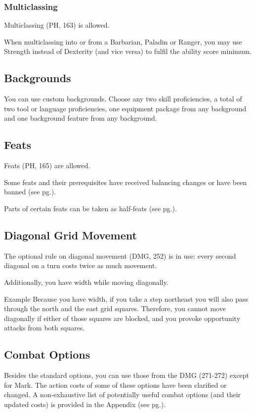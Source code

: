 \documentclass[letterpaper,twocolumn,openany,nodeprecatedcode]{dndbook}
\newcommand{\pg}[1]{pg.\pageref{#1}}
\begin{document}
\subsubsection{Multiclassing}
Multiclassing (PH, 163) is allowed. 

When multiclassing into or from a Barbarian, Paladin or Ranger, you may use Strength instead of Dexterity (and vice versa) to fulfil the ability score minimum. 

\subsection{Backgrounds}
You can use custom backgrounds. Choose any two skill proficiencies, a total of two tool or language proficiencies, one equipment package from any background and one background feature from any background.

\subsection{Feats}
Feats (PH, 165) are allowed. 

Some feats and their prerequisites have received balancing changes or have been banned (see \pg{balance-feats}).

Parts of certain feats can be taken as half-feats (see \pg{balance-feats-subfeats}).

\subsection{Diagonal Grid Movement}
The optional rule on diagonal movement (DMG, 252) is in use: every second diagonal on a turn costs twice as much movement.

Additionally, you have width while moving diagonally. 

\begin{DndComment}{Example}
Because you have width, if you take a step northeast you will also pass through the north and the east grid squares. Therefore, you cannot move diagonally if either of those squares are blocked, and you provoke opportunity attacks from both squares.
\end{DndComment}
\subsection{Combat Options}
Besides the standard options, you can use those from the DMG (271-272) except for Mark. The action costs of some of these options have been clarified or changed. A non-exhaustive list of potentially useful combat options (and their updated costs) is provided in the Appendix (see \pg{appendix-combat-options}). 
\end{document}
